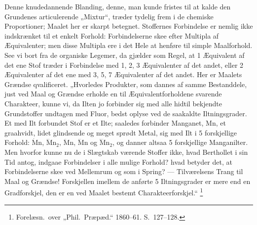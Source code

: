 \documentclass[12pt]{book}
\newcommand{\opage}[1]{\marginnote{\footnotesize\textit{[#1]}}}
\begin{document}
Denne knudedannende Blanding, denne, man kunde fristes til at kalde den Grundenes
articulerende „Mixtur“, træder tydelig frem i de chemiske Proportioner; Maalet her er
skarpt betegnet.
\opage{323} Stoffernes Forbindelse er nemlig ikke indskrænket til et enkelt Forhold:
Forbindelserne skee efter Multipla af Æquivalenter; men disse Multipla ere i det Hele
at henføre til simple Maalforhold. See vi bort fra de organiske Legemer, da gjælder
som Regel, at 1 Æquivalent af det ene Stof træder i Forbindelse med 1, 2, 3
Æquivalenter af det andet, eller 2 Æquivalenter af det ene med 3, 5, 7 Æquivalenter af
det andet. Her er Maalets Grændse qvalificeret. „Hvorledes Produkter, som dannes af
samme Bestanddele, just ved Maal og Grændse erholde en til Æquivalentforholdene
svarende Charakteer, kunne vi, da Ilten jo forbinder sig med alle hidtil bekjendte
Grundstoffer undtagen med Fluor, bedst oplyse ved de saakaldte Iltningsgrader. Et med
Ilt forbundet Stof er et Ilte; saaledes forbinder Manganet, $\mathrm{Mn}$, et
graahvidt, lidet glindsende og meget sprødt Metal, sig med Ilt i 5 forskjellige
Forhold: $\dot{\mathrm{M}}\mathrm{n}$, $\dddot{\mathrm{M}}\mathrm{n}_{2}$,
$\ddot{\mathrm{M}}\mathrm{n}$, $\dddot{\mathrm{M}}\mathrm{n}$ og
$\ddddot{\mathrm{M}}\mathrm{n}_{2}$, og danner altsaa 5 forskjellige Manganilter. Men
hvorfor kunne nu de i Slægtskab værende Stoffer ikke, hvad Berthollet i sin Tid antog,
indgaae Forbindelser i alle mulige Forhold? hvad betyder det, at Forbindelserne skee
ved Mellemrum og som i Spring? — Tilværelsens Trang til Maal og Grændse! Forskjellen
imellem de anførte 5 Iltningsgrader er mere end en Gradforskjel, den er en ved Maalet
bestemt Charakteerforskjel.“%
\footnote{Forelæsn.\ over „Phil.\ Præpæd.“ 1860--61. S.~127--128.}
\end{document}
